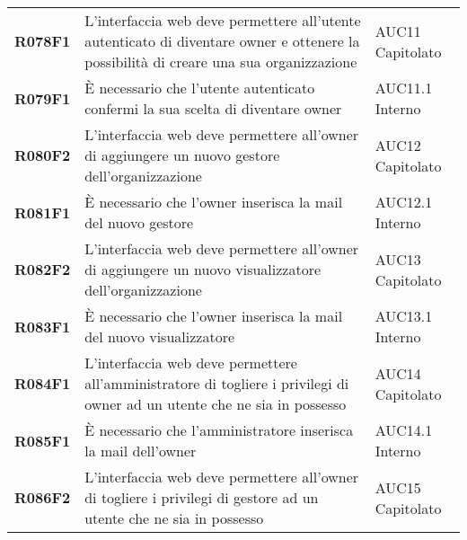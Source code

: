 \documentclass[../analisi-dei-requisiti.tex]{subfiles}
\begin{document}
\begin{longtable}[H]{>{\centering\bfseries}m{3cm} >{\centering}m{10cm} >{\centering\arraybackslash}m{3cm}}
  R078F1                               & L'interfaccia web deve permettere all'utente autenticato di diventare owner e ottenere la possibilità di creare una sua organizzazione                                                                  & AUC11 Capitolato               \\
  R079F1                               & È necessario che l'utente autenticato confermi la sua scelta di diventare owner                                                                                                                         & AUC11.1 Interno                \\
  R080F2                               & L'interfaccia web deve permettere all'owner di aggiungere un nuovo gestore dell'organizzazione                                                                                                          & AUC12 Capitolato               \\
  R081F1                               & È necessario che l'owner inserisca la mail del nuovo gestore                                                                                                                                            & AUC12.1 Interno                \\
  R082F2                               & L'interfaccia web deve permettere all'owner di aggiungere un nuovo visualizzatore dell'organizzazione                                                                                                   & AUC13 Capitolato               \\
  R083F1                               & È necessario che l'owner inserisca la mail del nuovo visualizzatore                                                                                                                                     & AUC13.1 Interno                \\
  R084F1                               & L'interfaccia web deve permettere all'amministratore di togliere i privilegi di owner ad un utente che ne sia in possesso                                                                               & AUC14 Capitolato              \\
  R085F1                               & È necessario che l'amministratore inserisca la mail dell'owner                                                                                                                                          & AUC14.1 Interno               \\
  R086F2                               & L'interfaccia web deve permettere all'owner di togliere i privilegi di gestore ad un utente che ne sia in possesso                                                                                      & AUC15 Capitolato              \\

\end{longtable}
\end{document}
